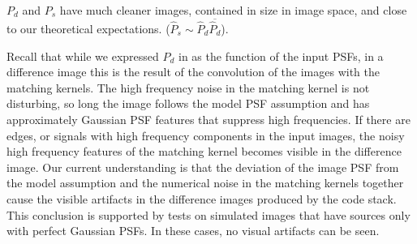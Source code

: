 \documentclass[11pt]{article}
\begin{document}
%
\par \(P_d\) and \(P_s\) have much cleaner images, contained in size
in image space, and close to our theoretical
expectations. (\(\hat{P}_s \sim \hat{P}_d \overline{\hat{P}_d}\)).
%
\par Recall that while we expressed \(P_d\) in  as the
function of the input PSFs, in a difference image this is the result
of the convolution of the images with the matching kernels.  The high
frequency noise in the matching kernel is not disturbing, so long the
image follows the model PSF assumption and has approximately Gaussian
PSF features that suppress high frequencies. If there are edges, or
signals with high frequency components in the input images, the noisy
high frequency features of the matching kernel becomes visible in the
difference image. Our current understanding is that the deviation of
the image PSF from the model assumption and the numerical noise
in the matching kernels together cause the visible artifacts in the
difference images produced by the code stack. This conclusion is
supported by tests on simulated images that have sources only with
perfect Gaussian PSFs. In these cases, no visual artifacts can be seen.
%
\end{document}
